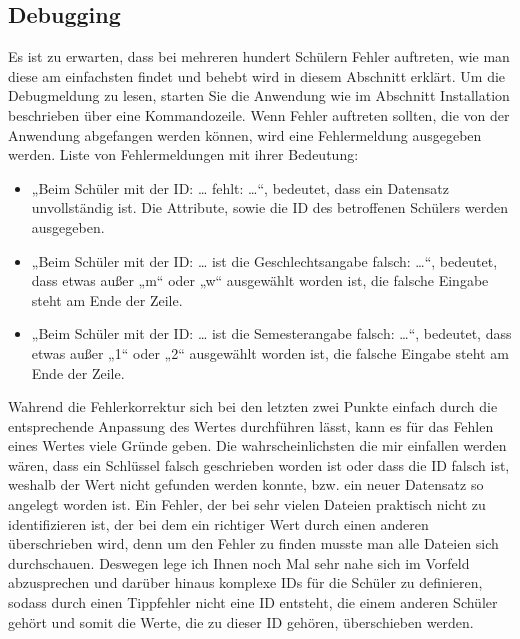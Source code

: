 \documentclass[a4paper,10pt]{scrartcl}
\begin{document}
   \subsection{Debugging}
   Es ist zu erwarten, dass bei mehreren hundert Schülern Fehler auftreten, wie man diese am einfachsten findet und behebt wird in diesem Abschnitt erklärt.
   Um die Debugmeldung zu lesen, starten Sie die Anwendung wie im Abschnitt Installation beschrieben über eine Kommandozeile. Wenn Fehler auftreten sollten, die von der Anwendung abgefangen werden können, wird eine Fehlermeldung ausgegeben werden.
Liste von Fehlermeldungen mit ihrer Bedeutung:
   \begin{itemize}
      \item „Beim Schüler mit der ID: … fehlt: …“, bedeutet, dass ein Datensatz unvollständig ist. Die Attribute, sowie die ID des betroffenen Schülers werden ausgegeben.
      \item „Beim Schüler mit der ID: … ist die Geschlechtsangabe falsch: …“, bedeutet, dass etwas außer „m“ oder „w“ ausgewählt worden ist, die falsche Eingabe steht am Ende der Zeile.
      \item „Beim Schüler mit der ID: … ist die Semesterangabe falsch: …“, bedeutet, dass etwas außer „1“ oder „2“ ausgewählt worden ist, die falsche Eingabe steht am Ende der Zeile. 
   \end{itemize}
   Wahrend die Fehlerkorrektur sich bei den letzten zwei Punkte einfach durch die entsprechende Anpassung des Wertes durchführen lässt, kann es für das Fehlen eines Wertes viele Gründe geben. Die wahrscheinlichsten die mir einfallen werden wären, dass ein Schlüssel falsch geschrieben worden ist oder dass die ID falsch ist, weshalb der Wert nicht gefunden werden konnte, bzw. ein neuer Datensatz so angelegt worden ist. \newline
   Ein Fehler, der bei sehr vielen Dateien praktisch nicht zu identifizieren ist, der bei dem ein richtiger Wert durch einen anderen überschrieben wird, denn um den Fehler zu finden musste man alle Dateien sich durchschauen. Deswegen lege ich Ihnen noch Mal sehr nahe sich im Vorfeld abzusprechen und darüber hinaus komplexe IDs für die Schüler zu definieren, sodass durch einen Tippfehler nicht eine ID entsteht, die einem anderen Schüler gehört und somit die Werte, die zu dieser ID gehören, überschieben werden.
\end{document}
